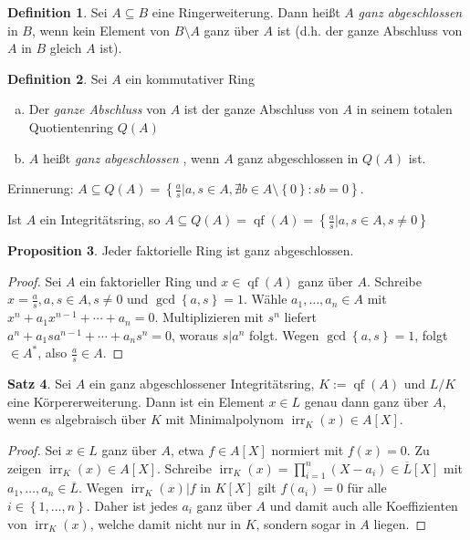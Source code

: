 \documentclass[
twoside=semi,
fontsize=12,
DIV=12, 
cleardoublepage=current,
leqno,
headings=optiontoheadandtoc, 
toc=idx
]{scrbook}
\newcommand{\set}[1]{\left\{ #1 \right\}}
\DeclareMathOperator{\qf}{qf}
\DeclareMathOperator{\irr}{irr}
\theoremstyle{definition}
\newtheorem{definition}{Definition}[section]
\newtheorem{satz}[definition]{Satz}
\newtheorem{proposition}[definition]{Proposition}
\begin{document}
 	\begin{definition}\label{2.1.11}
 		Sei $A \subseteq B$ eine Ringerweiterung. Dann hei\ss t $A$ \emph{ganz abgeschlossen} in $B$, wenn kein Element von $B\setminus A$ ganz \"uber $A$ ist (d.h. der ganze Abschluss von $A$ in $B$ gleich $A$ ist).
 	\end{definition}
 
 	\begin{definition}\label{2.1.12}
 		Sei $A$ ein kommutativer Ring
 		\begin{enumerate}[(a)]
 			\item Der \emph{ganze Abschluss} von $A$ ist der ganze Abschluss von $A$ in seinem totalen Quotientenring $Q(A)$
 			
 			\item $A$ hei\ss t \emph{ganz abgeschlossen} , wenn $A$ ganz abgeschlossen in $Q(A)$ ist.
 		\end{enumerate}
 		Erinnerung: $A \subseteq Q(A) = \set{\frac{a}{s}| a,s \in A, \nexists b \in A\setminus\set{0}: sb = 0}$.
 		
 		Ist $A$ ein Integrit\"atsring, so $A \subseteq Q(A) = \qf(A) = \set{\frac{a}{s}|a,s \in A, s \neq 0}$ 
 	\end{definition}
 
 	\begin{proposition}\label{2.1.13}
 		Jeder faktorielle Ring ist ganz abgeschlossen.
 		
 		\begin{proof}
 			Sei $A$ ein faktorieller Ring und $x \in \qf(A)$ ganz \"uber $A$. Schreibe $x = \frac{a}{s}, a, s \in A, s \neq 0$ und $\gcd \set{a,s} = 1$. W\"ahle $a_1,\dots, a_n \in A$ mit $x^n + a_1x^{n-1}+\cdots + a_n = 0$. Multiplizieren mit $s^n$ liefert $a^n + a_1sa^{n-1}+\cdots + a_ns^n = 0$, woraus $s|a^n$ folgt. Wegen $\gcd\set{a,s} = 1$, folgt $ \in A^*$, also $\frac{a}{s} \in A$.
 		\end{proof}
 	\end{proposition}
 
 	\begin{satz}\label{2.1.14}
 		Sei $A$ ein ganz abgeschlossener Integrit\"atsring, $K:= \qf(A)$ und $L/K$ eine K\"orpererweiterung. Dann ist ein Element $x\in L$ genau dann ganz \"uber $A$, wenn es algebraisch \"uber $K$ mit Minimalpolynom $\irr_K(x) \in A[X]$.
 		
 		\begin{proof}
 			Sei $x\in L$ ganz \"uber $A$, etwa $f\in A[X]$ normiert mit $f(x) = 0$. Zu zeigen $\irr_K(x) \in A[X]$.
 			Schreibe $\irr_K(x) = \prod_{i=1}^n (X-a_i) \in \overline{L}[X]$ mit $a_1,\dots,a_n \in \overline{L}$. Wegen $\irr_K(x)|f$ in $K[X]$ gilt $f(a_i) = 0$ f\"ur alle $i\in\set{1,\dots,n}$. Daher ist jedes $a_i$ ganz \"uber $A$ und damit auch alle Koeffizienten von $\irr_K(x)$, welche damit nicht nur in $K$, sondern sogar in $A$ liegen.
 		\end{proof}
 	\end{satz}
 
\end{document}
